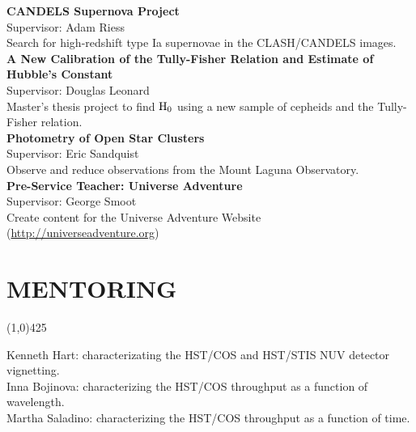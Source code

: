 \documentclass{res}
\begin{document}
\begin{resume}
{\bf CANDELS Supernova Project}\hspace{116pt}\\
\hspace*{24pt}Supervisor: Adam Riess \\
\hspace*{24pt}Search for high-redshift type Ia supernovae in the CLASH/CANDELS images.\\
{\bf  A New Calibration of the Tully-Fisher Relation and Estimate of Hubble's Constant} \\ %
\hspace*{24pt}Supervisor: Douglas Leonard\\
\hspace*{24pt}Master's thesis project to find $\rm{H_0}$ using a new sample of cepheids and the Tully-Fisher relation.   \\
{\bf Photometry of Open Star Clusters } \hspace{87pt}\\
\hspace*{24pt}Supervisor: Eric Sandquist\\
\hspace*{24pt}Observe and reduce observations from the Mount Laguna Observatory. \\ 
{\bf Pre-Service Teacher: Universe Adventure} \hspace{56pt}\\
\hspace*{24pt}Supervisor: George Smoot \\
\hspace*{24pt}Create content for the Universe Adventure Website ({\color{blue}\url{http://universeadventure.org}}) 
%
\section{MENTORING} 
\vspace{-.2in}
\begin{center}
\line(1,0){425}
\end{center}
\vspace{-.3in}
\vspace{0.1in}
Kenneth Hart: characterizating the HST/COS and HST/STIS NUV detector vignetting. \\
Inna Bojinova: characterizing the HST/COS throughput as a function of wavelength. \\
Martha Saladino: characterizing the HST/COS throughput as a function of time. 
%

\end{resume}
\end{document}
